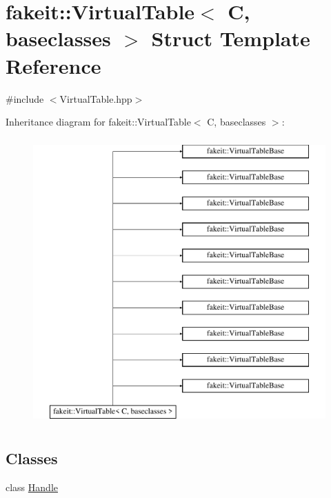 \hypertarget{structfakeit_1_1VirtualTable}{}\section{fakeit\+::Virtual\+Table$<$ C, baseclasses $>$ Struct Template Reference}
\label{structfakeit_1_1VirtualTable}


{\ttfamily \#include $<$Virtual\+Table.\+hpp$>$}

Inheritance diagram for fakeit\+::Virtual\+Table$<$ C, baseclasses $>$\+:\begin{figure}[H]
\begin{center}
\leavevmode
\includegraphics[height=11.000000cm]{structfakeit_1_1VirtualTable}
\end{center}
\end{figure}
\subsection*{Classes}
\begin{DoxyCompactItemize}
\item 
class \mbox{\hyperlink{classfakeit_1_1VirtualTable_1_1Handle}{Handle}}
\end{DoxyCompactItemize}
